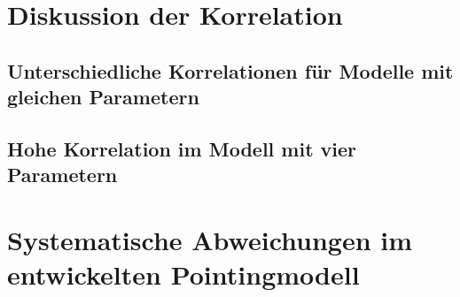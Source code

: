 \section{Diskussion der Korrelation}
\subsection{Unterschiedliche Korrelationen für Modelle mit gleichen Parametern}
\subsection{Hohe Korrelation im Modell mit vier Parametern}

\section{Systematische Abweichungen im entwickelten Pointingmodell}